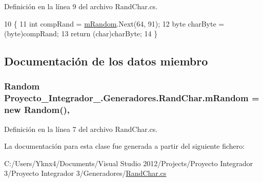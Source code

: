 Definición en la línea 9 del archivo Rand\-Char.\-cs.


\begin{DoxyCode}
10         \{
11             \textcolor{keywordtype}{int} compRand = \hyperlink{class_proyecto___integrador__3_1_1_generadores_1_1_rand_char_adffe3586409f4c532130cf3559ac25d9}{mRandom}.Next(64, 91);
12             byte charByte = (byte)compRand;
13             \textcolor{keywordflow}{return} (\textcolor{keywordtype}{char})charByte;
14         \}
\end{DoxyCode}


\subsection{Documentación de los datos miembro}
\hypertarget{class_proyecto___integrador__3_1_1_generadores_1_1_rand_char_adffe3586409f4c532130cf3559ac25d9}{
\subsubsection[{m\-Random}]{\setlength{\rightskip}{0pt plus 5cm}Random Proyecto\-\_\-\-Integrador\-\_.\-Generadores.\-Rand\-Char.\-m\-Random = new Random()\hspace{0.3cm}{\ttfamily [static]}, {\ttfamily [private]}}}\label{class_proyecto___integrador__3_1_1_generadores_1_1_rand_char_adffe3586409f4c532130cf3559ac25d9}


Definición en la línea 7 del archivo Rand\-Char.\-cs.



La documentación para esta clase fue generada a partir del siguiente fichero\-:\begin{DoxyCompactItemize}
\item 
C\-:/\-Users/\-Yknx4/\-Documents/\-Visual Studio 2012/\-Projects/\-Proyecto Integrador 3/\-Proyecto Integrador 3/\-Generadores/\hyperlink{_rand_char_8cs}{Rand\-Char.\-cs}\end{DoxyCompactItemize}
